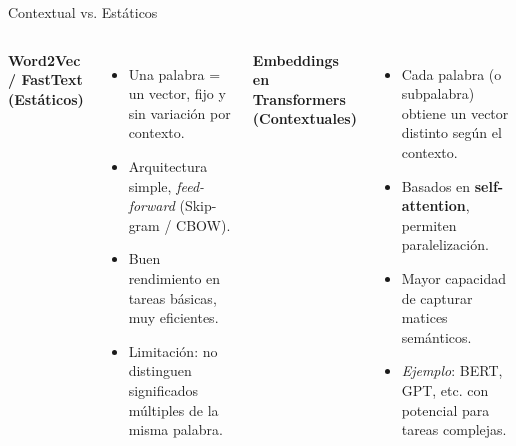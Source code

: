 \documentclass{beamer}
\begin{document}
\begin{frame}{Contextual vs. Estáticos}
  \begin{columns}[T]
      \textbf{Word2Vec / FastText (Estáticos)}
      \begin{itemize}
        \item Una palabra = un vector, fijo y sin variación por contexto.
        \item Arquitectura simple, \textit{feed-forward} (Skip-gram / CBOW).
        \item Buen rendimiento en tareas básicas, muy eficientes.
        \item Limitación: no distinguen significados múltiples de la misma palabra.
      \end{itemize}
      \textbf{Embeddings en Transformers (Contextuales)}
      \begin{itemize}
        \item Cada palabra (o subpalabra) obtiene un vector distinto según el contexto.
        \item Basados en \textbf{self-attention}, permiten paralelización.
        \item Mayor capacidad de capturar matices semánticos.
        \item \textit{Ejemplo}: BERT, GPT, etc. con potencial para tareas complejas.
      \end{itemize}
  \end{columns}
\end{frame}
\end{document}
